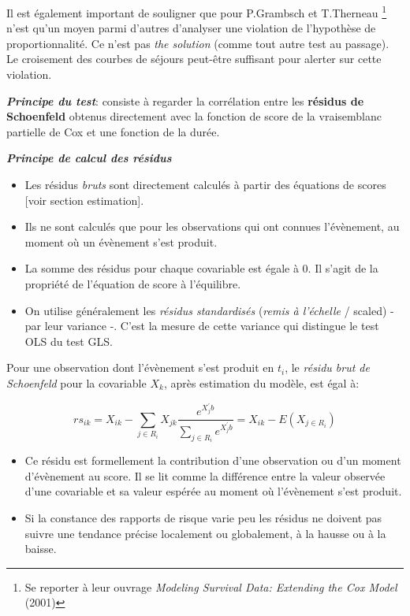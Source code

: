 \documentclass[
  12pt,
  letterpaper,
  DIV=11,
  numbers=noendperiod,
  onepage,
  openany]{scrreprt}
\providecommand{\tightlist}{%
  \setlength{\itemsep}{0pt}\setlength{\parskip}{0pt}}\usepackage{longtable,booktabs,array}
\begin{document}
Il est également important de souligner que pour P.Grambsch et
T.Therneau \footnote{Se reporter à leur ouvrage \emph{Modeling Survival
  Data: Extending the Cox Model} (2001)} n'est qu'un moyen parmi
d'autres d'analyser une violation de l'hypothèse de proportionnalité. Ce
n'est pas \emph{the solution} (comme tout autre test au passage). Le
croisement des courbes de séjours peut-être suffisant pour alerter sur
cette violation.

\textbf{\emph{Principe du test}}: consiste à regarder la corrélation
entre les \textbf{résidus de Schoenfeld} obtenus directement avec la
fonction de score de la vraisemblanc partielle de Cox et une fonction de
la durée.

\textbf{\emph{Principe de calcul des résidus}}

\begin{itemize}
\tightlist
\item
  Les résidus \emph{bruts} sont directement calculés à partir des
  équations de scores {[}voir section estimation{]}.
\item
  Ils ne sont calculés que pour les observations qui ont connues
  l'évènement, au moment où un évènement s'est produit.
\item
  La somme des résidus pour chaque covariable est égale à 0. Il s'agit
  de la propriété de l'équation de score à l'équilibre.
\item
  On utilise généralement les \emph{résidus standardisés} (\emph{remis à
  l'échelle} / scaled) - par leur variance -. C'est la mesure de cette
  variance qui distingue le test OLS du test GLS.
\end{itemize}

Pour une observation dont l'évènement s'est produit en \(t_i\), le
\emph{résidu brut de Schoenfeld} pour la covariable \(X_k\), après
estimation du modèle, est égal à:

\[rs_{ik}=X_{ik}- \sum_{j\in R_i}X_{jk}\frac{e^{X_{j}^{'}b}}{\sum_{j\in R_i}e^{X_{j}^{'}b}}= X_{ik} - E(X_{j\in R_i})\]

\begin{itemize}
\item
  Ce résidu est formellement la contribution d'une observation ou d'un
  moment d'évènement au score. Il se lit comme la différence entre la
  valeur observée d'une covariable et sa valeur espérée au moment où
  l'évènement s'est produit.
\item
  Si la constance des rapports de risque varie peu les résidus ne
  doivent pas suivre une tendance précise localement ou globalement, à
  la hausse ou à la baisse.
\end{itemize}
\end{document}
